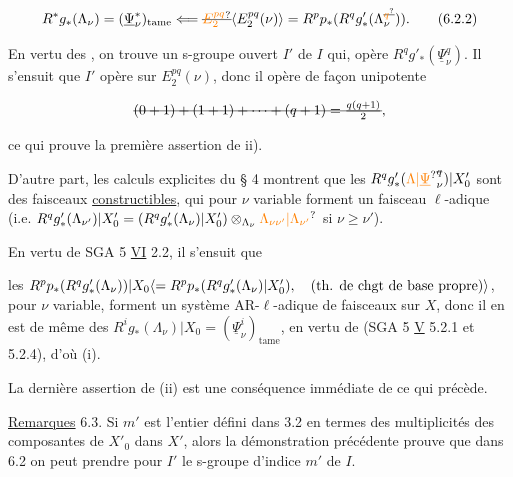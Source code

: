 \[
R^*g_*(\Lambda_\nu)=(\underline{\Psi}_\nu^*)_{\mathrm{tame}}\Longleftarrow\deleted{\unsure{E_2^{pq}}}\inserted{E_2^{pq}(\nu)}=R^p p_*(R^q g'_*(\Lambda_\nu^{\deleted{\unsure{q}}})).
\tag*{(6.2.2)}
\]

En vertu des , on trouve un s-groupe ouvert $I'$ de $I$ qui,  opère  $R^q g'_*(\underline{\Psi}_\nu^q)$. Il s'ensuit que $I'$ opère   sur $E_2^{pq}(\nu)$, donc  il opère de façon unipotente  

\[
\deleted{(0+1)+(1+1)+\cdots+(q+1)=\frac{q(q+1)}{2}},
\]

ce qui prouve la première assertion de ii).

D'autre part, les calculs explicites du § 4 montrent que les $R^q g'_*(\unsure{\Lambda|\underline{\Psi}}_\nu^{\deleted{q}})|X'_0$ sont des faisceaux \uline{constructibles}, qui pour $\nu$ variable forment un faisceau  $\ell$-adique (i.e. $R^q g'_*(\Lambda_{\nu'})|X'_0=(R^q g'_*(\Lambda_\nu)|X'_0)\otimes_{\Lambda_\nu}\unsure{\Lambda_{\nu\nu'}|\Lambda_{\nu'}}$ si $\nu\geq\nu'$).

En vertu de SGA 5 \uline{VI} 2.2, il s'ensuit que


les $R^p p_*(R^qg'_*(\Lambda_\nu))|X_0\inserted{=R^p p_*(R^qg'_*(\Lambda_\nu)|X'_0),\quad\text{(th. de chgt de base propre)}}$, pour $\nu$ variable, forment un système AR-$\ell$-adique de faisceaux sur $X$, donc il en est de même des $R^i g_*(\Lambda_\nu)|X_0=(\underline{\Psi}_\nu^i)_{\mathrm{tame}}$, en vertu de (SGA 5 \uline{V} 5.2.1 et 5.2.4), d'où (i).

La dernière assertion de (ii)  est une conséquence immédiate de ce qui précède.

\uline{Remarques} 6.3. Si $m'$ est l'entier défini dans 3.2 en termes des multiplicités des composantes de $X'_0$ dans $X'$, alors la démonstration précédente prouve que dans 6.2 on peut prendre pour $I'$ le s-groupe  d'indice $m'$ de $I$.

